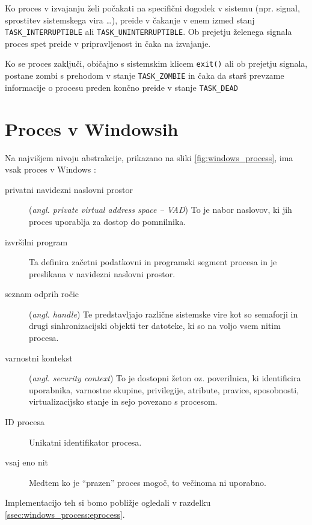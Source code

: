 \documentclass[a4paper,12pt,openright]{book}
\begin{document}
Ko proces v izvajanju želi počakati na specifični dogodek v sistemu (npr. signal, sprostitev sistemskega vira \dots), preide v čakanje v enem izmed stanj \texttt{TASK\_INTERRUPTIBLE} ali \texttt{TASK\_UNINTERRUPTIBLE}.
Ob prejetju želenega signala proces spet preide v pripravljenost in čaka na izvajanje.

Ko se proces zaključi, običajno s sistemskim klicem \texttt{exit()} ali ob prejetju signala, postane zombi s prehodom v stanje \texttt{TASK\_ZOMBIE} in čaka da starš prevzame informacije o procesu preden končno preide v stanje \texttt{TASK\_DEAD}

\section{Proces v Windowsih}

Na najvišjem nivoju abstrakcije, prikazano na sliki \ref{fig:windows_process}, ima vsak proces v Windows \cite{Yosifovich_Russinovich_Solomon_Ionescu_2017}:
\begin{description}
	\item[privatni navidezni naslovni prostor] (\textit{angl. private virtual address space -- VAD}) To je nabor naslovov, ki jih proces uporablja za dostop do pomnilnika.
	\item[izvršilni program] Ta definira začetni podatkovni in programski segment procesa in je preslikana v navidezni naslovni prostor.
	\item[seznam odprih ročic]  (\textit{angl. handle}) Te predstavljajo različne sistemske vire kot so semaforji in drugi sinhronizacijski objekti ter datoteke, ki so na voljo vsem nitim procesa.
	\item[varnostni kontekst] (\textit{angl. security context}) To je dostopni žeton oz. poverilnica, ki identificira uporabnika, varnostne skupine, privilegije, atribute, pravice, sposobnosti, virtualizacijsko stanje in sejo povezano s procesom.
	\item[ID procesa] Unikatni identifikator procesa.
	\item[vsaj eno nit] Medtem ko je ``prazen'' proces mogoč, to večinoma ni uporabno. 
\end{description}
Implementacijo teh si bomo pobližje ogledali v razdelku \ref{ssec:windows_process:eprocess}.
\end{document}
